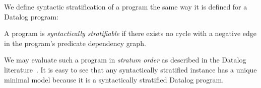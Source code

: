 
We define syntactic stratification of a \slang program the same way it is
defined for a Datalog program:

\begin{definition}
%
A \slang program is \emph{syntactically stratifiable} if there
exists no cycle with a negative edge 
in the program's
predicate dependency graph.
%
\end{definition}


We may evaluate such a program in {\em stratum order} as described in the
Datalog literature~\cite{ullmanbook}.
It is easy to see that any syntactically stratified \slang instance has a
unique minimal model because it is a syntactically stratified Datalog program.

%
%

%

%

